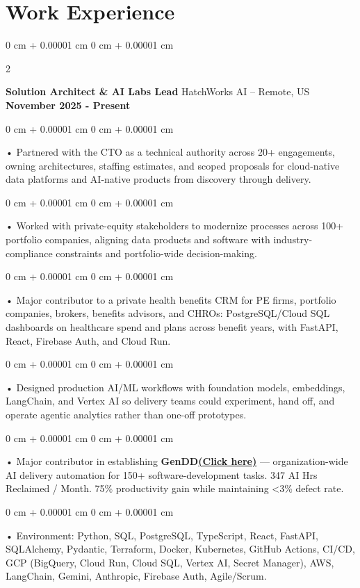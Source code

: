 \documentclass[10pt, letterpaper]{article}
\newenvironment{onecolentry}{
    \begin{adjustwidth}{
        0 cm + 0.00001 cm
    }{
        0 cm + 0.00001 cm
    }
}{
    \end{adjustwidth}
} %
\newenvironment{twocolentry}[2][]{
    \onecolentry
    \def\secondColumn{#2}
    \setcolumnwidth{\fill, 4.5 cm}
    \begin{paracol}{2}
}{
    \switchcolumn \raggedleft \secondColumn
    \end{paracol}
    \endonecolentry
} %
\begin{document}
    \vspace{0.5cm}
    \section{Work Experience}
        \vspace{0.1cm}

        \begin{twocolentry}{
            \textbf{November 2025 - Present}
        }
            \textbf{Solution Architect \& AI Labs Lead} HatchWorks AI -- Remote, US\end{twocolentry}

        \begin{onecolentry}
             • Partnered with the CTO as a technical authority across 20+ engagements, owning architectures, staffing estimates, and scoped proposals for cloud-native data platforms and AI-native products from discovery through delivery.
        \end{onecolentry}
        \begin{onecolentry}
             • Worked with private-equity stakeholders to modernize processes across 100+ portfolio companies, aligning data products and software with industry-compliance constraints and portfolio-wide decision-making.
        \end{onecolentry}
        \begin{onecolentry}
             • Major contributor to a private health benefits CRM for PE firms, portfolio companies, brokers, benefits advisors, and CHROs: PostgreSQL/Cloud SQL dashboards on healthcare spend and plans across benefit years, with FastAPI, React, Firebase Auth, and Cloud Run.
        \end{onecolentry}
        \begin{onecolentry}
             • Designed production AI/ML workflows with foundation models, embeddings, LangChain, and Vertex AI so delivery teams could experiment, hand off, and operate agentic analytics rather than one-off prototypes.
        \end{onecolentry}
        \begin{onecolentry}
             • Major contributor in establishing \textbf{GenDD}\href{https://hatchworks.com/generative-driven-development/}{\textbf{(Click here)}} --- organization-wide AI delivery automation for 150+ software-development tasks. 347 AI Hrs Reclaimed / Month. 75\% productivity gain while maintaining \textless3\% defect rate.
        \end{onecolentry}
        \begin{onecolentry}
             • Environment: Python, SQL, PostgreSQL, TypeScript, React, FastAPI, SQLAlchemy, Pydantic, Terraform, Docker, Kubernetes, GitHub Actions, CI/CD, GCP (BigQuery, Cloud Run, Cloud SQL, Vertex AI, Secret Manager), AWS, LangChain, Gemini, Anthropic, Firebase Auth, Agile/Scrum.
        \end{onecolentry}
\end{document}
